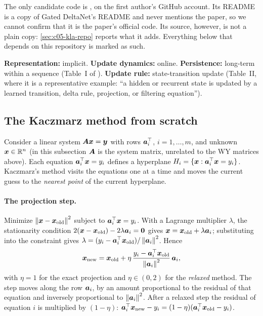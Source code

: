\begin{pitfall}[title={Code status: unconfirmed}]
The only candidate code is , on the first author's
GitHub account. Its README is a copy of Gated DeltaNet's README and never mentions the paper, so
we cannot confirm that it is the paper's official code. Its source, however, is not a plain copy:
\cref{sec:c05-kla-repo} reports what it adds. Everything below that depends on this repository is
marked as such.
\end{pitfall}

\begin{taxonomy}
\textbf{Representation:} implicit. \textbf{Update dynamics:} online. \textbf{Persistence:}
long-term within a sequence (Table~I of \citet{zhoubian2026memory}). \textbf{Update rule:}
state-transition update (Table~II, where it is a representative example: ``a hidden or recurrent
state is updated by a learned transition, delta rule, projection, or filtering equation'').
\end{taxonomy}

\subsection{The Kaczmarz method from scratch}\label{sec:c05-kla-kaczmarz}

Consider a linear system $\bm{A}\bm{x} = \bm{y}$ with rows $\bm{a}_i^{\top}$, $i = 1,\dots,m$, and unknown
$\bm{x} \in \mathbb{R}^n$ (in this subsection $\bm{A}$ is the system matrix, unrelated to the WY matrices above). Each equation $\bm{a}_i^{\top}\bm{x} = y_i$ defines a hyperplane
$H_i = \{\bm{x} : \bm{a}_i^{\top}\bm{x} = y_i\}$. Kaczmarz's method \citep{c05-kaczmarz1937} visits the equations
one at a time and moves the current guess to the \emph{nearest point} of the current hyperplane.

\paragraph{The projection step.} Minimize $\left\lVert \bm{x} - \bm{x}_{\mathrm{old}}\right\rVert^2$ subject to
$\bm{a}_i^{\top}\bm{x} = y_i$. With a Lagrange multiplier $\lambda$, the stationarity condition
$2(\bm{x} - \bm{x}_{\mathrm{old}}) - 2\lambda\bm{a}_i = \mathbf 0$ gives $\bm{x} = \bm{x}_{\mathrm{old}} + \lambda\bm{a}_i$;
substituting into the constraint gives $\lambda = (y_i - \bm{a}_i^{\top}\bm{x}_{\mathrm{old}})/\left\lVert \bm{a}_i\right\rVert^2$.
Hence
\begin{equation}\label{eq:c05-kaczmarz}
  \bm{x}_{\mathrm{new}} = \bm{x}_{\mathrm{old}} + \eta\,\frac{y_i - \bm{a}_i^{\top}\bm{x}_{\mathrm{old}}}{\left\lVert \bm{a}_i\right\rVert^2}\,\bm{a}_i ,
\end{equation}
with $\eta = 1$ for the exact projection and $\eta \in (0,2)$ for the \emph{relaxed} method. The
step moves along the row $\bm{a}_i$, by an amount proportional to the residual of that equation and
inversely proportional to $\left\lVert \bm{a}_i\right\rVert^2$. After a relaxed step the residual of equation $i$ is
multiplied by $(1-\eta)$: $\bm{a}_i^{\top}\bm{x}_{\mathrm{new}} - y_i = (1-\eta)(\bm{a}_i^{\top}\bm{x}_{\mathrm{old}} - y_i)$.

